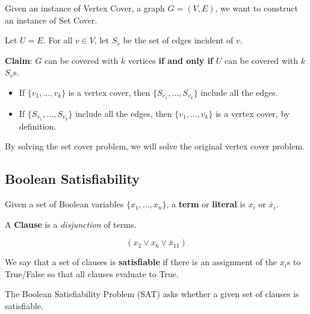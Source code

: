 \documentclass[12pt]{article}
\begin{document}


  {
    Given an instance of Vertex Cover, a graph $G = (V, E)$, we want to
    construct an instance of Set Cover.

    Let $U = E$. For all $v \in V$, let $S_v$ be the set of edges incident of
    $v$.

    {\bf Claim}: $G$ can be covered with $k$ vertices {\bf if and only if} $U$
    can be covered with $k$ $S_v$s.

    \begin{itemize}
      \item If $\{v_1, \dots, v_k\}$ is a vertex cover, then $\{S_{v_1}, \dots,
        S_{v_k}\}$ include all the edges.

      \item If $\{S_{v_1}, \dots, S_{v_k}\}$ include all the edges, then $\{v_1,
        \dots, v_k\}$ is a vertex cover, by definition.
    \end{itemize}
  }

  By solving the set cover problem, we will solve the original vertex cover
  problem.

  \subsection{Boolean Satisfiability}

  \Definition {} {
    Given a set of Boolean variables $\{x_1, \dots, x_n\}$, a {\bf term} or {\bf
    literal} is $x_i$ or $\bar x_i$.

    A {\bf Clause} is a {\it disjunction} of terms.

    \[
      (x_2 \vee x_6 \vee \bar x_{11})
    \]

    We say that a set of clauses is {\bf satisfiable} if there is an assignment
    of the $x_i$s to True/False so that all clauses evaluate to True.
  }

  The Boolean Satisfiability Problem (SAT) asks whether a given set of clauses
  is satisfiable.


\end{document}
